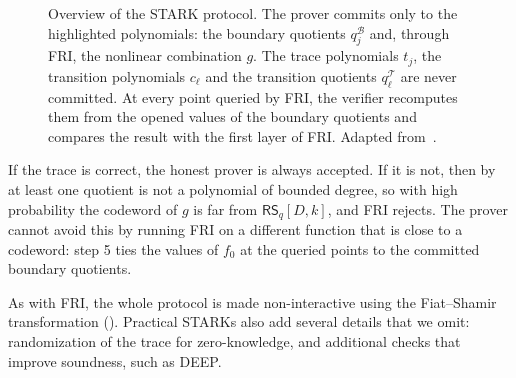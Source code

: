 \documentclass[../../book]{subfiles}
\begin{document}
\begin{figure}[h!]
{
    }
    \caption{Overview of the STARK protocol. The prover commits only to the highlighted polynomials:
    the boundary quotients $q^{\mathcal{B}}_j$ and, through FRI, the nonlinear combination $g$. The trace
    polynomials $t_j$, the transition polynomials $c_\ell$ and the transition quotients
    $q^{\mathcal{T}}_\ell$ are never committed. At every point queried by FRI, the verifier recomputes
    them from the opened values of the boundary quotients and compares the result with the first layer
    of FRI. Adapted from~\cite{szepieniec2021anatomy}.}
    \label{fig:stark-scheme}
\end{figure}

If the trace is correct, the honest prover is always accepted. If it is not, then by
 at least one quotient is not a polynomial of bounded degree, so with high
probability the codeword of $g$ is far from $\mathsf{RS}_q[D,k]$, and FRI rejects. The prover cannot
avoid this by running FRI on a different function that is close to a codeword: step 5 ties the values
of $f_0$ at the queried points to the committed boundary quotients.

\begin{remark}
  As with FRI, the whole protocol is made non-interactive using the Fiat--Shamir transformation
  (). Practical STARKs also add several details that we omit: randomization
  of the trace for zero-knowledge, and additional checks that improve soundness, such as DEEP.
\end{remark}
\end{document}

